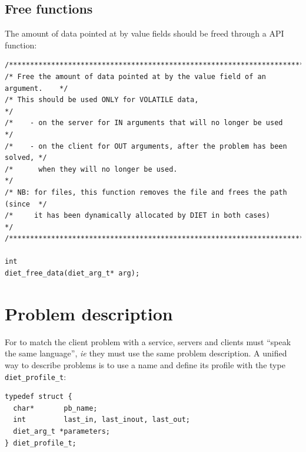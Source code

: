\subsection{Free functions}
\label{sec:freefun}

The amount of data  pointed at by value fields should be freed through a \diet
API function:
{\footnotesize
\begin{verbatim}
/****************************************************************************/
/* Free the amount of data pointed at by the value field of an argument.    */
/* This should be used ONLY for VOLATILE data,                              */
/*    - on the server for IN arguments that will no longer be used          */
/*    - on the client for OUT arguments, after the problem has been solved, */
/*      when they will no longer be used.                                   */
/* NB: for files, this function removes the file and frees the path (since  */
/*     it has been dynamically allocated by DIET in both cases)             */
/****************************************************************************/

int
diet_free_data(diet_arg_t* arg);
\end{verbatim}
}


\section{Problem description}
\label{sec:pbdesc}

For \diet to match the client problem with a service, servers and clients must
``speak the same language'', \emph{ie} they must use the same problem
description. A unified way to describe problems is to use a name and define its
profile with the type \texttt{diet\_profile\_t}:
{\footnotesize
\begin{verbatim}
typedef struct {
  char*       pb_name;
  int         last_in, last_inout, last_out;
  diet_arg_t *parameters;
} diet_profile_t;
\end{verbatim}
}




